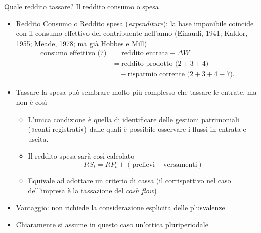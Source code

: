 \documentclass[11pt]{beamer}
\newcommand\€{\,\text{€}}
\begin{document}
\begin{frame}{Quale reddito tassare? Il reddito consumo o spesa}
\begin{itemize}
\item \alert{Reddito Consumo} o \alert{Reddito spesa} (\emph{expenditure}): la base imponibile
coincide con il consumo effettivo del contribuente nell'anno (Einaudi, 1941;
Kaldor, 1955; Meade, 1978; ma già Hobbes e Mill)
\begin{equation*}\label{eq:redconsumo}
\begin{split}
\text{consumo effettivo (7)} &=\text{reddito entrata} - \Delta W\\
&=\text{reddito prodotto ($2+3+4$)}\\
&\quad{}-\text{risparmio corrente ($2+3+4-7$)}.    
\end{split}
\end{equation*}
\item Tassare la spesa può sembrare molto più complesso che tassare le entrate, ma
non è così
\begin{itemize}
\item L'unica condizione è quella di identificare delle gestioni patrimoniali
(«conti registrati») dalle quali è possibile osservare i flussi in entrata
e uscita.
\item Il reddito spesa sarà così calcolato
\begin{equation*}
 RS_{t}=RP_{t} + (\text{prelievi} - \text{versamenti})
\end{equation*}
\item Equivale ad adottare un criterio di cassa (il corrispettivo nel caso
dell'impresa è la tassazione del \emph{cash flow})
\end{itemize}
\item Vantaggio: non richiede la considerazione esplicita delle plusvalenze
\item Chiaramente si assume in questo caso un'ottica \alert{pluriperiodale}
\end{itemize}
\end{frame}
\end{document}
